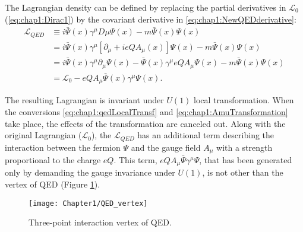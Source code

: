 The Lagrangian density can be defined by replacing the partial derivatives in $\mathcal{L}_{0}$ (\ref{eq:chap1:Dirac1}) by the covariant derivative in \ref{eq:chap1:NewQEDderivative}:
\begin{equation}\label{eq:chap1:Dirac2}
\begin{split}
	\mathcal{L}_{QED} &\equiv i \bar{\Psi}(x) \gamma^{\mu} D{\mu} \Psi(x) - m \bar{\Psi}(x) \Psi(x) \\
				&=  i \bar{\Psi}(x) \gamma^{\mu} [ \partial_{\mu} + ieQA_{\mu}(x)] \Psi(x) - m \bar{\Psi}(x) \Psi(x) \\
				&=  i \bar{\Psi}(x) \gamma^{\mu} \partial_{\mu} \Psi(x) -\bar{\Psi}(x) \gamma^{\mu}eQA_{\mu}\Psi(x)   - m \bar{\Psi}(x) \Psi(x) \\
				&= \mathcal{L}_{0} - eQA_{\mu}\bar{\Psi}(x)\gamma^{\mu}\Psi(x).
\end{split}
\end{equation}

The resulting Lagrangian is invariant under $U(1)$ local transformation. When the conversions \ref{eq:chap1:qedLocalTransf} and 
\ref{eq:chap1:AmuTransformation} take place, the effects of the transformation are canceled out. 
Along with the original Lagrangian ($\mathcal{L}_{0}$), the $\mathcal{L}_{QED}$ has an additional term describing the interaction 
between the fermion $\Psi$ and the gauge field $A_{\mu}$ with a strength proportional to the charge $eQ$. 
This term, $eQA_{\mu}\bar{\Psi}\gamma^{\mu}\Psi$, that has been generated only by demanding the gauge invariance
under $U(1)$, is not other than the vertex of QED (Figure \ref{fig:Chap1:QED_Vertex}). 
\begin{figure}
    \centering
    \texttt{[image: Chapter1/QED\_vertex]}
    \caption{Three-point interaction vertex of QED.}
    \label{fig:Chap1:QED_Vertex}
\end{figure}

